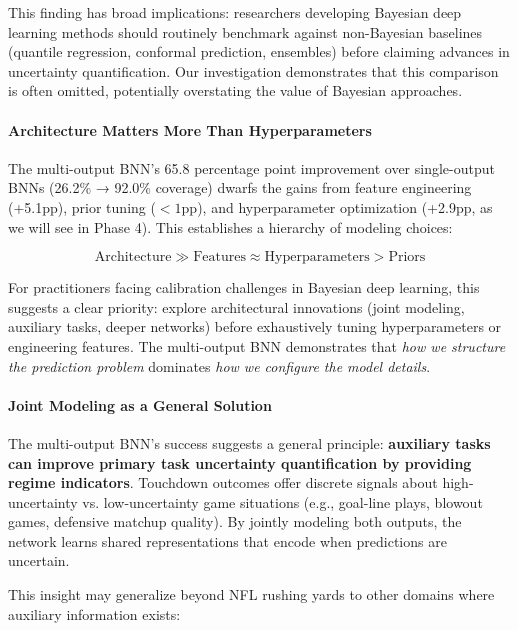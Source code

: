 This finding has broad implications: researchers developing Bayesian deep learning methods should routinely benchmark against non-Bayesian baselines (quantile regression, conformal prediction, ensembles) before claiming advances in uncertainty quantification. Our investigation demonstrates that this comparison is often omitted, potentially overstating the value of Bayesian approaches.

\paragraph{Architecture Matters More Than Hyperparameters}

The multi-output BNN's 65.8 percentage point improvement over single-output BNNs (26.2\% → 92.0\% coverage) dwarfs the gains from feature engineering (+5.1pp), prior tuning ($<1$pp), and hyperparameter optimization (+2.9pp, as we will see in Phase 4). This establishes a hierarchy of modeling choices:

\begin{equation}
    \text{Architecture} \gg \text{Features} \approx \text{Hyperparameters} > \text{Priors}
\end{equation}

For practitioners facing calibration challenges in Bayesian deep learning, this suggests a clear priority: explore architectural innovations (joint modeling, auxiliary tasks, deeper networks) before exhaustively tuning hyperparameters or engineering features. The multi-output BNN demonstrates that \textit{how we structure the prediction problem} dominates \textit{how we configure the model details}.

\paragraph{Joint Modeling as a General Solution}

The multi-output BNN's success suggests a general principle: \textbf{auxiliary tasks can improve primary task uncertainty quantification by providing regime indicators}. Touchdown outcomes offer discrete signals about high-uncertainty vs. low-uncertainty game situations (e.g., goal-line plays, blowout games, defensive matchup quality). By jointly modeling both outputs, the network learns shared representations that encode when predictions are uncertain.

This insight may generalize beyond NFL rushing yards to other domains where auxiliary information exists:

